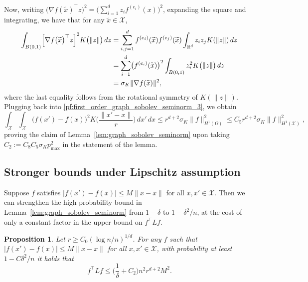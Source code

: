 \documentclass[twoside]{article}
\newcommand{\Reals}{\mathbb{R}}
\newcommand{\1}{\mathbf{1}}
\newcommand{\Rd}{\Reals^d}
\newcommand{\Xset}{\mathcal{X}}
\newcommand{\mc}[1]{\mathcal{#1}}
\newcommand{\wt}[1]{\widetilde{#1}}
\newtheorem{proposition}{Proposition}
\theoremstyle{definition}
\theoremstyle{remark}
\begin{document}
Now, writing $\bigl(\nabla f(\wt{x}) ^{\top} z\bigr)^2 = \bigl(\sum_{i = 1}^{d} z_{i} f^{(e_i)}(x) \bigr)^2$, expanding the square and integrating, we have that for any $\wt{x} \in \Xset$,
\begin{align*}
\int_{B(0,1)} \Bigl[\nabla f\bigl(\wt{x}\bigr)^{\top} z\Bigr]^2 K\bigl(\|z\|\bigr) \,dz & = \sum_{i,j = 1}^{d} f^{(e_i)}(\wt{x}) f^{(e_j)}(\wt{x}) \int_{\Rd} z_iz_jK(\|z\|) \,dz \\
& = \sum_{i = 1}^{d} \bigl(f^{(e_i)}(\wt{x})\bigr)^2 \int_{B(0,1)} z_i^2 K\bigl(\|z\|\bigr) \,dz \\
& = \sigma_K \|\nabla f(\wt{x})\|^2,
\end{align*}
where the last equality follows from the rotational symmetry of $K(\|z\|)$. Plugging back into \eqref{pf:first_order_graph_sobolev_seminorm_3}, we obtain
\begin{equation*}
\int_{\Xset} \int_{\Xset} \bigl(f(x') - f(x)\bigr)^2 K\biggl(\frac{\|x' - x\|}{r}\biggr) \,dx' \,dx \leq r^{d + 2} \sigma_K \|f\|_{H^1(\Omega)}^2 \leq C_5 r^{d + 2} \sigma_K \|f\|_{H^1(\mc{X})}^2,
\end{equation*}
proving the claim of Lemma~\ref{lem:graph_sobolev_seminorm} upon taking $C_2 := C_8C_5 \sigma_K p_{\max}^2$ in the statement of the lemma.

\subsection{Stronger bounds under Lipschitz assumption}

Suppose $f$ satisfies $|f(x') - f(x)| \leq M \|x - x\|$ for all $x,x' \in \mc{X}$. Then we can strengthen the high probability bound in Lemma~\ref{lem:graph_sobolev_seminorm} from $1 - \delta$ to $1 - \delta^2/n$, at the cost of only a constant factor in the upper bound on $f^{\top} L f$.
\begin{proposition}
	\label{prop:graph_sobolev_seminorm_lipschitz}
	Let $r \geq C_0(\log n/n)^{1/d}$. For any $f$ such that $|f(x') - f(x)| \leq M \|x - x\|$ for all $x,x' \in \mc{X}$, with probability at least $1 - C\delta^2/n$ it holds that
	\begin{equation*}
	f^{\top} L f \leq \biggl(\frac{1}{\delta} + C_2\biggr) n^2 r^{d + 2} M^2.
	\end{equation*}
\end{proposition}
\end{document}
